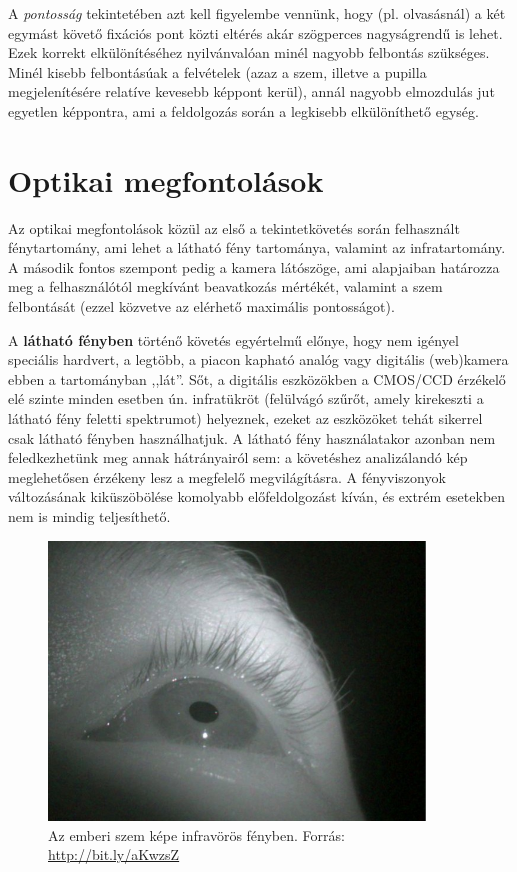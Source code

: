 A \textit{pontosság} tekintetében azt kell figyelembe vennünk, hogy (pl. olvasásnál) a két egymást követő fixációs pont közti eltérés akár szögperces nagyságrendű is lehet. Ezek korrekt elkülönítéséhez nyilvánvalóan minél nagyobb felbontás szükséges. Minél kisebb felbontásúak a felvételek (azaz a szem, illetve a pupilla megjelenítésére relatíve kevesebb képpont kerül), annál nagyobb elmozdulás jut egyetlen képpontra, ami a feldolgozás során a legkisebb elkülöníthető egység.


\section{Optikai megfontolások}\label{sect:hw_optikai}

Az optikai megfontolások közül az első a tekintetkövetés során felhasznált fénytartomány, ami lehet a látható fény tartománya, valamint az infratartomány. A második fontos szempont pedig a kamera látószöge, ami alapjaiban határozza meg a felhasználótól megkívánt beavatkozás mértékét, valamint a szem felbontását (ezzel közvetve az elérhető maximális pontosságot).

\bigskip

A \textbf{látható fényben} történő követés egyértelmű előnye, hogy nem igényel speciális hardvert, a legtöbb, a piacon kapható analóg vagy digitális (web)kamera ebben a tartományban ,,lát''. Sőt, a digitális eszközökben a CMOS/CCD érzékelő elé szinte minden esetben ún. infratükröt (felülvágó szűrőt, amely kirekeszti a látható fény feletti spektrumot) helyeznek, ezeket az eszközöket tehát sikerrel csak látható fényben használhatjuk. A látható fény használatakor azonban nem feledkezhetünk meg annak hátrányairól sem: a követéshez analizálandó kép meglehetősen érzékeny lesz a megfelelő megvilágításra. A fényviszonyok változásának kiküszöbölése komolyabb előfeldolgozást kíván, és extrém esetekben nem is mindig teljesíthető.

\begin{figure}[!ht]
\centering
\includegraphics[width=100mm, keepaspectratio]{figures/infra_eye.png}
\caption{Az emberi szem képe infravörös fényben. Forrás: \url{http://bit.ly/aKwzsZ}}
\label{fig:eyepic}
\end{figure}

